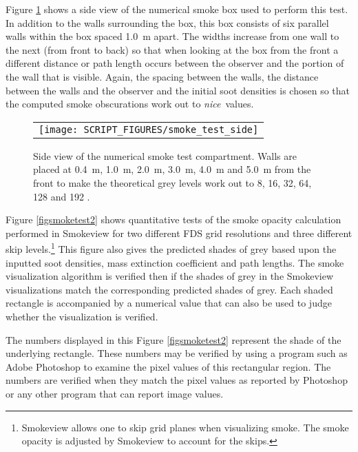 \documentclass[11pt,twoside]{book}
\newcommand{\figoptions}{hbp}
\begin{document}
Figure \ref{figsmoketestgeom} shows a side view of the numerical smoke box used to perform this test.  In addition to the walls surrounding the box, this box consists of  six parallel walls within the box spaced 1.0~m apart.  The widths increase from one wall to the next (from front to back) so that when looking at the box from the front a different distance or path length occurs between the observer and the portion of the wall that is visible.  Again, the spacing between the walls, the distance between the walls and the observer and the initial soot densities is chosen so that the computed smoke obscurations work out to {\em nice}\ values.

\begin{figure}[\figoptions]
\begin{center}
 \centering
\begin{tabular}{c}
 \texttt{[image: SCRIPT\_FIGURES/smoke\_test\_side]}
 \end{tabular}
\end{center}
 \caption[Side view of numerical smoke test compartment.]{Side view of the numerical smoke test compartment.  Walls are placed at 0.4~m, 1.0~m, 2.0~m, 3.0~m, 4.0~m and 5.0~m from the front to make the theoretical grey levels work out to 8, 16, 32, 64, 128 and 192 .}
\label{figsmoketestgeom}%
\end{figure}

Figure \ref{figsmoketest2} shows quantitative tests of the smoke opacity calculation performed in Smokeview for two different FDS grid resolutions and three different skip levels.\footnote{Smokeview allows one to skip grid planes when visualizing smoke.  The smoke opacity is adjusted by Smokeview to account for the skips.} This figure also gives the predicted shades of grey based upon the inputted soot densities, mass extinction coefficient and path lengths.  The smoke visualization algorithm is verified then if the shades of grey in the Smokeview visualizations match the corresponding predicted shades of grey.  Each shaded
rectangle is accompanied by a numerical value that can also be used to judge whether the visualization is verified.

The numbers displayed in this Figure \ref{figsmoketest2} represent the shade of the underlying rectangle.  These numbers may be verified by using a program such as Adobe Photoshop to examine the pixel values of this rectangular region.  The numbers are verified when they match the pixel values as reported by Photoshop or any other program that can report image values.
\end{document}
